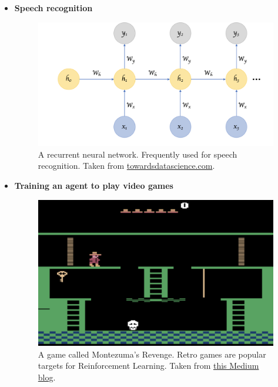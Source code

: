 \documentclass{article}
\begin{document}
\begin{itemize}
            \clearpage

            \item \textbf{Speech recognition}
                \begin{figure}[h]
                    \includegraphics[width = \textwidth]{rnn.png}
                    \caption{A recurrent neural network. Frequently used for speech recognition. Taken from \href{https://towardsdatascience.com/recurrent-neural-networks-d4642c9bc7ce}{towardsdatascience.com}.}
                \end{figure}
            
            \clearpage

            \item \textbf{Training an agent to play video games}
                \begin{figure}[h]
                    \includegraphics[width = \textwidth]{rlgame.png}
                    \caption{A game called Montezuma's Revenge. Retro games are popular targets for Reinforcement Learning. Taken from \href{https://medium.com/@awjuliani/on-solving-montezumas-revenge-2146d83f0bc3}{this Medium blog}.}
            

\end{figure}
\end{itemize}
\end{document}
